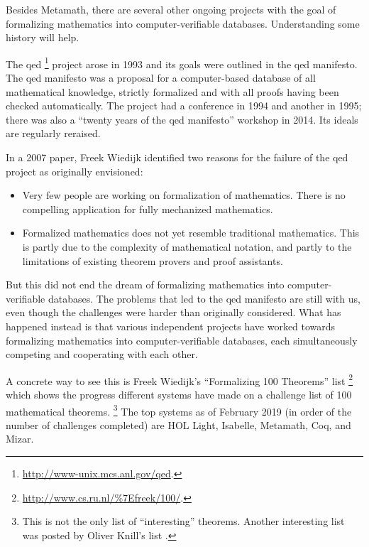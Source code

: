 Besides Metamath, there are several other ongoing projects with the goal of
formalizing mathematics into computer-verifiable databases.
Understanding some history will help.

The {\sc qed}%
\footnote{\url{http://www-unix.mcs.anl.gov/qed}.}
project arose in 1993 and its goals were outlined in the
{\sc qed} manifesto.
The {\sc qed} manifesto was
a proposal for a computer-based database of all mathematical knowledge,
strictly formalized and with all proofs having been checked automatically.
The project had a conference in 1994 and another in 1995;
there was also a ``twenty years of the {\sc qed} manifesto'' workshop
in 2014.
Its ideals are regularly reraised.

In a 2007 paper, Freek Wiedijk identified two reasons
for the failure of the {\sc qed} project as originally envisioned:%
\cite{Wiedijk-revisited}

\begin{itemize}
\item Very few people are working on formalization of mathematics. There is no compelling application for fully mechanized mathematics.
\item Formalized mathematics does not yet resemble traditional mathematics. This is partly due to the complexity of mathematical notation, and partly to the limitations of existing theorem provers and proof assistants.
\end{itemize}

But this did not end the dream of
formalizing mathematics into computer-verifiable databases.
The problems that led to the {\sc qed} manifesto are still with us,
even though the challenges were harder than originally considered.
What has happened instead is that various independent projects have
worked towards formalizing mathematics into computer-verifiable databases,
each simultaneously competing and cooperating with each other.

A concrete way to see this is
Freek Wiedijk's ``Formalizing 100 Theorems'' list%
\footnote{\url{http://www.cs.ru.nl/\%7Efreek/100/}.}
which shows the progress different systems have made on a challenge list
of 100 mathematical theorems.%
\footnote{ This is not the only list of ``interesting'' theorems.
Another interesting list was posted by Oliver Knill's list
\cite{Knill}.}
The top systems as of February 2019
(in order of the number of challenges completed) are
HOL Light, Isabelle, Metamath, Coq, and Mizar.

